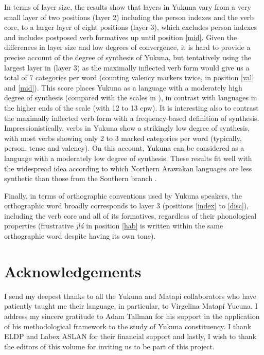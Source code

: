 \documentclass[output=paper]{langscibook}
\begin{document}
In terms of layer size, the results show that layers in Yukuna vary from a  very small layer of two positions (layer 2) including the person indexes and the verb core, to a larger layer of eight positions (layer 3), which excludes person indexes and includes postposed verb formatives up until position \ref{mid}. Given the differences in layer size and low degrees of convergence, it is hard to provide a precise account of the degree of synthesis of Yukuna, but tentatively using the largest layer in  (layer 3) as the maximally inflected verb form would give us a total of 7 categories per word (counting valency markers twice, in position \ref{val} and \ref{mid}). This score  places Yukuna as a language with a moderately high degree of synthesis (compared with the scales in \citealt{wals-22}), in contrast with languages in the higher ends of the scale (with 12 to 13 cpw). It is interesting also to contrast the maximally inflected verb form with a frequency-based definition of synthesis. Impressionistically, verbs in Yukuna show a strikingly low degree of synthesis, with most verbs showing only 2 to 3 marked categories per word (typically, person, tense and valency). On this account, Yukuna can be considered as a language with a moderately low degree of synthesis. These results fit well with the widespread idea according to which Northern Arawakan languages are less synthetic than those from the Southern branch \citep{aikh99}.

Finally, in terms of orthographic conventions used by Yukuna speakers, the orthographic word broadly corresponds to layer 3 (positions \ref{index} to \ref{disc}), including the verb core and all of its formatives, regardless of their phonological properties (frustrative \textit{jlá} in position \ref{hab} is written within the same orthographic word despite having its own tone). 

 
\section*{Acknowledgements}
I send my deepest thanks to all the Yukuna and Matapí collaborators who have patiently taught me their language, in particular, to Virgelina Matapí Yucuna. I address my sincere gratitude to Adam Tallman for his support in the application of his methodological framework to the study of Yukuna constituency. I thank ELDP and Labex ASLAN for their financial support and lastly, I wish to thank the editors of this volume for inviting us to be part of this project.

\newpage
\printglossary

\printbibliography[heading=subbibliography,notkeyword=this]
\end{document}
